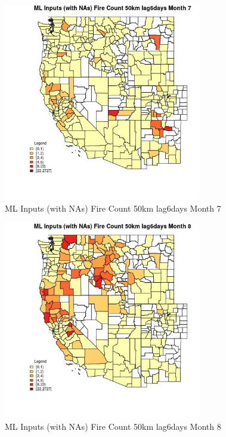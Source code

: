 \begin{figure} 
\centering  
\includegraphics[width=0.77\textwidth]{Code_Outputs/Report_ML_input_PM25_Step4_part_f_de_duplicated_aveswNAs_CountyFire_Count_50km_lag6daysmedianMonth7.jpg} 
\caption{\label{fig:Report_ML_input_PM25_Step4_part_f_de_duplicated_aveswNAsCountyFire_Count_50km_lag6daysmedianMonth7}ML Inputs (with NAs) Fire Count 50km lag6days Month 7} 
\end{figure} 
 

\begin{figure} 
\centering  
\includegraphics[width=0.77\textwidth]{Code_Outputs/Report_ML_input_PM25_Step4_part_f_de_duplicated_aveswNAs_CountyFire_Count_50km_lag6daysmedianMonth8.jpg} 
\caption{\label{fig:Report_ML_input_PM25_Step4_part_f_de_duplicated_aveswNAsCountyFire_Count_50km_lag6daysmedianMonth8}ML Inputs (with NAs) Fire Count 50km lag6days Month 8} 
\end{figure} 
 


